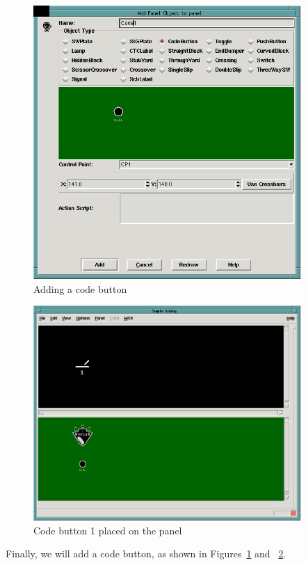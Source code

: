 \clearpage

\begin{figure}[hbpt] 
\begin{centering}
\includegraphics[width=4in]{DISPSimpleTutCB1.png} 
\caption{Adding a code button} 
\label{fig:dispatcher:Tut:CB1}
\end{centering}
\end{figure} 
%
\begin{figure}[hbpt] 
\begin{centering}
\includegraphics[width=4in]{DISPSimpleTutPanel3.png} 
\caption{Code button 1 placed on the panel} 
\label{fig:dispatcher:Tut:panel3} 
\end{centering}
\end{figure} 
%
Finally, we will add a code button, as shown in
Figures~\ref{fig:dispatcher:Tut:CB1} and
~\ref{fig:dispatcher:Tut:panel3}.

